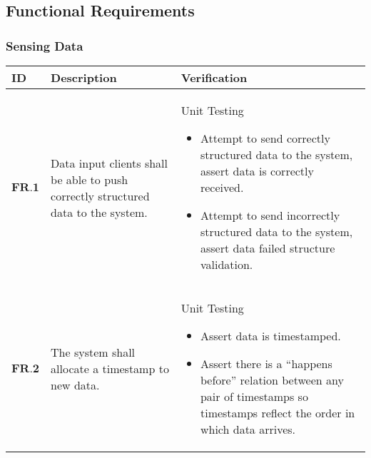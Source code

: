\subsection{Functional Requirements}
\subsubsection{Sensing Data}
\begin{longtable}[H]{| p{1.5cm} | p{4.5cm} | p{10.5cm} | }
    	\hline
    	\cellcolor{titleColor}\textbf{ID}   & \cellcolor{titleColor}\textbf{Description}                                                              & \cellcolor{titleColor}\textbf{Verification}                                                                                                                                                                                                                                     \\ \hline
    	$\textbf{FR.1}$ & Data input clients shall be able to push correctly structured data to the system. & Unit Testing 
	\begin{itemize} 
	\item Attempt to send correctly structured data to the system, assert data is correctly received.
	 \item Attempt to send incorrectly structured data to the system, assert data failed structure validation.
	 \end{itemize} \\ \hline
    	$\textbf{FR.2}$ & The system shall allocate a timestamp to new data.                                & Unit Testing\begin{itemize} \item Assert data is timestamped.\item Assert there is a ``happens before'' relation between any pair of timestamps so timestamps reflect the order in which data arrives.\end{itemize}\\ \hline
\end{longtable}


